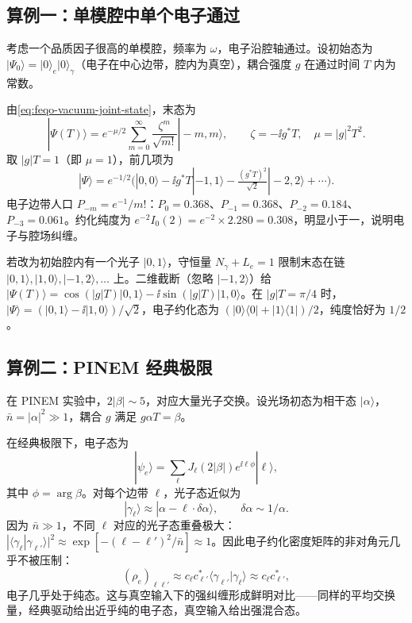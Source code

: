 \subsection{算例一：单模腔中单个电子通过}

\begin{workedexample}[单模腔联合态]
考虑一个品质因子很高的单模腔，频率为 \(\omega\)，电子沿腔轴通过。设初始态为 \(|\Psi_0\rangle=|0\rangle_e|0\rangle_\gamma\)（电子在中心边带，腔内为真空），耦合强度 \(g\) 在通过时间 \(T\) 内为常数。

由\cref{eq:feqo-vacuum-joint-state}，末态为
\[
|\Psi(T)\rangle=e^{-\mu/2}\sum_{m=0}^\infty
\frac{\zeta^m}{\sqrt{m!}}|-m,m\rangle,
\qquad \zeta=-\ii g^*T,\quad\mu=|g|^2T^2.
\]
取 \(|g|T=1\)（即 \(\mu=1\)），前几项为
\[
|\Psi\rangle=e^{-1/2}\bigl(|0,0\rangle-\ii g^*T|-1,1\rangle
-\tfrac{(g^*T)^2}{\sqrt{2}}|-2,2\rangle+\cdots\bigr).
\]
电子边带人口 \(P_{-m}=e^{-1}/m!\)：\(P_0=0.368\)、\(P_{-1}=0.368\)、\(P_{-2}=0.184\)、\(P_{-3}=0.061\)。约化纯度为 \(e^{-2}I_0(2)=e^{-2}\times2.280=0.308\)，明显小于一，说明电子与腔场纠缠。

若改为初始腔内有一个光子 \(|0,1\rangle\)，守恒量 \(N_\gamma+L_e=1\) 限制末态在链 \(|0,1\rangle,|1,0\rangle,|-1,2\rangle,\ldots\) 上。二维截断（忽略 \(|-1,2\rangle\)）给 \(|\Psi(T)\rangle=\cos(|g|T)|0,1\rangle-\ii\sin(|g|T)|1,0\rangle\)。在 \(|g|T=\pi/4\) 时，\(|\Psi\rangle=(|0,1\rangle-\ii|1,0\rangle)/\sqrt{2}\)，电子约化态为 \((|0\rangle\langle0|+|1\rangle\langle1|)/2\)，纯度恰好为 \(1/2\)。
\end{workedexample}

\subsection{算例二：PINEM 经典极限}

\begin{workedexample}
在 PINEM 实验中，\(2|\beta|\sim5\)，对应大量光子交换。设光场初态为相干态 \(|\alpha\rangle\)，\(\bar n=|\alpha|^2\gg1\)，耦合 \(g\) 满足 \(g\alpha T=\beta\)。

在经典极限下，电子态为
\[
|\psi_e\rangle=\sum_\ell J_\ell(2|\beta|)e^{\ii\ell\phi}|\ell\rangle,
\]
其中 \(\phi=\arg\beta\)。对每个边带 \(\ell\)，光子态近似为
\[
|\gamma_\ell\rangle\approx|\alpha-\ell\cdot\delta\alpha\rangle,
\qquad \delta\alpha\sim1/\alpha.
\]
因为 \(\bar n\gg1\)，不同 \(\ell\) 对应的光子态重叠极大：\(|\langle\gamma_\ell|\gamma_{\ell'}\rangle|^2\approx\exp[-(\ell-\ell')^2/\bar n]\approx1\)。因此电子约化密度矩阵的非对角元几乎不被压制：
\[
(\rho_e)_{\ell\ell'}\approx c_\ell c_{\ell'}^*\langle\gamma_{\ell'}|\gamma_\ell\rangle
\approx c_\ell c_{\ell'}^*,
\]
电子几乎处于纯态。这与真空输入下的强纠缠形成鲜明对比——同样的平均交换量，经典驱动给出近乎纯的电子态，真空输入给出强混合态。
\end{workedexample}

